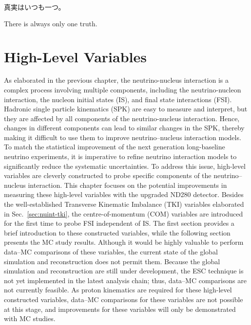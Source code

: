 \begin{savequote}[8cm]
\begin{CJK*}{UTF8}{min}
真実はいつも一つ。
\end{CJK*}

There is always only one truth.
\end{savequote}

\chapter{\label{ch:datamc}High-Level Variables} 
\minitoc

As elaborated in the previous chapter, the neutrino-nucleus interaction is a complex process involving multiple components, including the neutrino-nucleon interaction, the nucleon initial states (IS), and final state interactions (FSI).
Hadronic single particle kinematics (SPK) are easy to measure and interpret, but they are affected by all components of the neutrino-nucleus interaction. 
Hence, changes in different components can lead to similar changes in the SPK, thereby making it difficult to use them to improve neutrino–nucleus interaction models.
To match the statistical improvement of the next generation long-baseline neutrino experiments, it is imperative to refine neutrino interaction models to significantly reduce the systematic uncertainties.
To address this issue, high-level variables are cleverly constructed to probe specific components of the neutrino–nucleus interaction.
This chapter focuses on the potential improvements in measuring these high-level variables with the upgraded ND280 detector.
Besides the well-established Transverse Kinematic Imbalance (TKI) variables elaborated in Sec.~\ref{sec:nuint-tki}, the centre-of-momentum (COM) variables are introduced for the first time to probe FSI independent of IS.
The first section provides a brief introduction to these constructed variables, while the following section presents the MC study results.
Although it would be highly valuable to perform data–MC comparisons of these variables, the current state of the global simulation and reconstruction does not permit them.
Because the global simulation and reconstruction are still under development, the ESC technique is not yet implemented in the latest analysis chain; thus, data–MC comparisons are not currently feasible.
As proton kinematics are required for these high-level constructed variables, data–MC comparisons for these variables are not possible at this stage, and improvements for these variables will only be demonstrated with MC studies.

